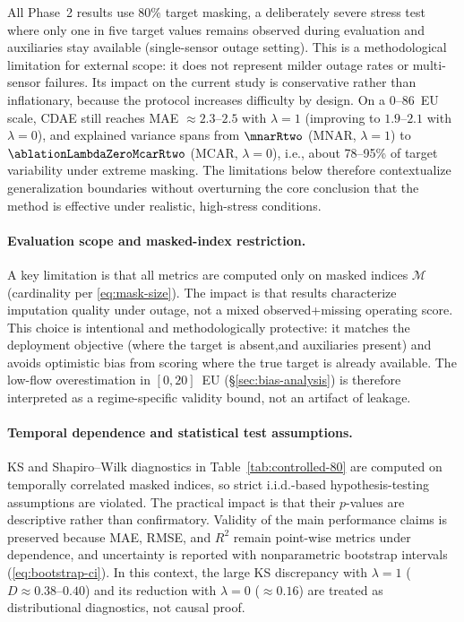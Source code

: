 All Phase~2 results use 80\% target masking, a deliberately severe stress test where only one in five target values remains observed during evaluation and auxiliaries stay available (single-sensor outage setting). This is a methodological limitation for external scope: it does not represent milder outage rates or multi-sensor failures. Its impact on the current study is conservative rather than inflationary, because the protocol increases difficulty by design. On a 0--86~EU scale, CDAE still reaches MAE $\approx 2.3$--$2.5$ with $\lambda{=}1$ (improving to $1.9$--$2.1$ with $\lambda{=}0$), and explained variance spans from $\mnarRtwo$ (MNAR, $\lambda{=}1$) to $\ablationLambdaZeroMcarRtwo$ (MCAR, $\lambda{=}0$), i.e., about 78--95\% of target variability under extreme masking. The limitations below therefore contextualize generalization boundaries without overturning the core conclusion that the method is effective under realistic, high-stress conditions.

\paragraph{Evaluation scope and masked-index restriction.}
A key limitation is that all metrics are computed only on masked indices $\mathcal{M}$ (cardinality per \eqref{eq:mask-size}). The impact is that results characterize imputation quality under outage, not a mixed observed+missing operating score. This choice is intentional and methodologically protective: it matches the deployment objective (where the target is absent,and auxiliaries present) and avoids optimistic bias from scoring where the true target is already available. The low-flow overestimation in $[0,20]$~EU (\S\ref{sec:bias-analysis}) is therefore interpreted as a regime-specific validity bound, not an artifact of leakage.

\paragraph{Temporal dependence and statistical test assumptions.}
KS and Shapiro--Wilk diagnostics in Table~\ref{tab:controlled-80} are computed on temporally correlated masked indices, so strict i.i.d.-based hypothesis-testing assumptions are violated. The practical impact is that their $p$-values are descriptive rather than confirmatory. Validity of the main performance claims is preserved because MAE, RMSE, and $R^2$ remain point-wise metrics under dependence, and uncertainty is reported with nonparametric bootstrap intervals (\eqref{eq:bootstrap-ci}). In this context, the large KS discrepancy with $\lambda{=}1$ ($D\approx 0.38$--$0.40$) and its reduction with $\lambda{=}0$ ($\approx 0.16$) are treated as distributional diagnostics, not causal proof.

